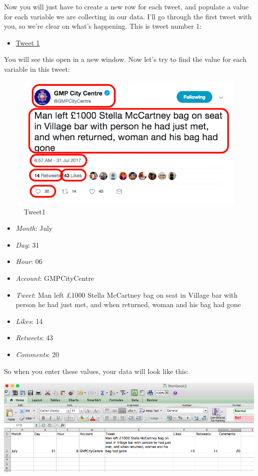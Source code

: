 \documentclass[
]{book}
\providecommand{\tightlist}{%
  \setlength{\itemsep}{0pt}\setlength{\parskip}{0pt}}
\begin{document}
Now you will just have to create a new row for each tweet, and populate a value for each variable we are collecting in our data. I'll go through the first tweet with you, so we're clear on what's happening.
This is tweet number 1:

\begin{itemize}
\tightlist
\item
  \href{https://twitter.com/GMPCityCentre/status/891900693585506304}{Tweet 1}
\end{itemize}

You will see this open in a new window. Now let's try to find the value for each variable in this tweet:

\begin{figure}
\centering
\includegraphics{imgs/tweet1.png}
\caption{Tweet1}
\end{figure}

\begin{itemize}
\tightlist
\item
  \emph{Month}: July
\item
  \emph{Day}: 31
\item
  \emph{Hour}: 06
\item
  \emph{Account}: GMPCityCentre
\item
  \emph{Tweet}: Man left £1000 Stella McCartney bag on seat in Village bar with person he had just met, and when returned, woman and his bag had gone
\item
  \emph{Likes}: 14
\item
  \emph{Retweets}: 43
\item
  \emph{Comments}: 20
\end{itemize}

So when you enter these values, your data will look like this:

\includegraphics{imgs/tweet1_entered.png}
\end{document}
